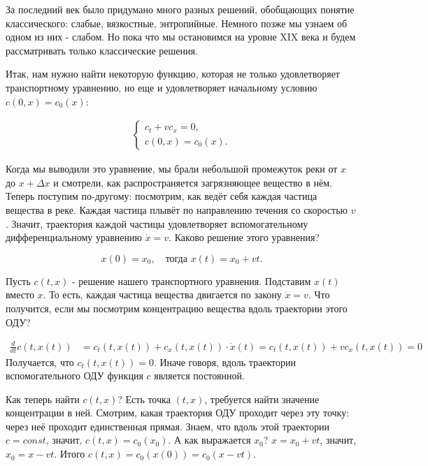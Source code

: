 За последний век было придумано много разных решений, обобщающих понятие классического: слабые, вязкостные, энтропийные. Немного позже мы узнаем об одном из них - слабом. Но пока что мы остановимся на уровне XIX века и будем рассматривать только классические решения.

Итак, нам нужно найти некоторую функцию, которая не только удовлетворяет транспортному уравнению, но еще и удовлетворяет начальному условию $ c (0, x) = c_0 (x) $:

\begin{align}
    \begin{cases} 
        c_t + v c_x = 0, \\
        c (0, x) = c_0 (x).
    \end{cases}
\label{transport}
\end{align}

Когда мы выводили это уравнение, мы брали небольшой промежуток реки от $x$ до $ x + \Delta x $ и смотрели, как распространяется загрязняющее вещество в нём. Теперь поступим по-другому: посмотрим, как ведёт себя каждая частица вещества в реке. Каждая частица плывёт по направлению течения со скоростью $v$. Значит, траектория каждой частицы удовлетворяет вспомогательному дифференциальному уравнению $ \dot x = v $. Каково решение этого уравнения?

\[
	x(0) = x_0,\quad \text{тогда } x(t) = x_0 + v t .
\]


Пусть $ c (t, x) $ - решение нашего транспортного уравнения. Подставим $ x(t) $ вместо $x$. То есть, каждая частица вещества двигается по закону $ \dot x = v $. Что получится, если мы посмотрим концентрацию вещества вдоль траектории этого ОДУ?

\begin{align*}
    \frac {d} {dt} c (t, x(t)) & = c_t (t, x(t)) + c_x (t, x(t)) \cdot \dot x (t) = c_t (t, x(t)) + v c_x (t, x(t)) = 0
\end{align*}
Получается, что $ c_t (t, x(t)) = 0 $. Иначе говоря, вдоль траектории вспомогательного ОДУ функция $c$ является постоянной.

Как теперь найти $ c (t,x) $? Есть точка $ (t, x) $, требуется найти значение концентрации в ней. Смотрим, какая траектория ОДУ проходит через эту точку: через неё проходит единственная прямая. Знаем, что вдоль этой траектории $ c = const $, значит, $ c (t, x) = c_0 (x_0) $. А как выражается $ x_0 $? $ x = x_0 + v t $, значит, $ x_0 = x - vt $.
Итого $c(t,x) = c_0(x(0)) = c_0(x-vt)$.

